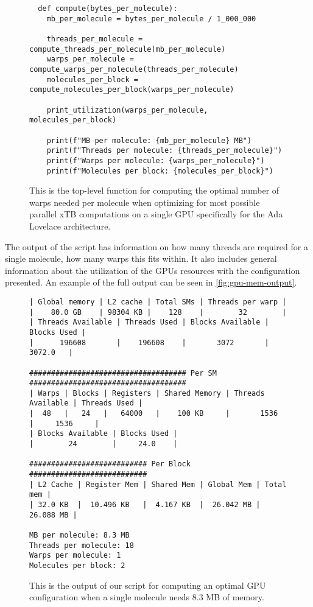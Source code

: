 \begin{figure}[h!]
\begin{verbatim}
  def compute(bytes_per_molecule):
    mb_per_molecule = bytes_per_molecule / 1_000_000

    threads_per_molecule = compute_threads_per_molecule(mb_per_molecule)
    warps_per_molecule = compute_warps_per_molecule(threads_per_molecule)
    molecules_per_block = compute_molecules_per_block(warps_per_molecule)

    print_utilization(warps_per_molecule, molecules_per_block)

    print(f"MB per molecule: {mb_per_molecule} MB")
    print(f"Threads per molecule: {threads_per_molecule}")
    print(f"Warps per molecule: {warps_per_molecule}")
    print(f"Molecules per block: {molecules_per_block}")
\end{verbatim}
  \caption{This is the top-level function for computing the optimal number of warps needed per molecule when optimizing for most possible parallel xTB computations on a single GPU specifically for the Ada Lovelace architecture.}
\end{figure}

The output of the script has information on how many threads are required for a single molecule, how many warps this fits within. It also includes general information about the utilization of the GPUs resources with the configuration presented. An example of the full output can be seen in \autoref{fig:gpu-mem-output}.


\begin{figure}[h!]
\begin{verbatim}
| Global memory | L2 cache | Total SMs | Threads per warp |
|    80.0 GB    | 98304 KB |    128    |        32        |
| Threads Available | Threads Used | Blocks Available | Blocks Used |
|      196608       |    196608    |       3072       |    3072.0   |

#################################### Per SM ####################################
| Warps | Blocks | Registers | Shared Memory | Threads Available | Threads Used |
|  48   |   24   |   64000   |    100 KB     |       1536        |     1536     |
| Blocks Available | Blocks Used |
|        24        |     24.0    |

########################### Per Block ###########################
| L2 Cache | Register Mem | Shared Mem | Global Mem | Total mem |
| 32.0 KB  |  10.496 KB   |  4.167 KB  |  26.042 MB | 26.088 MB |

MB per molecule: 8.3 MB
Threads per molecule: 18
Warps per molecule: 1
Molecules per block: 2
\end{verbatim}
\caption{This is the output of our script for computing an optimal GPU configuration when a single molecule needs $8.3$ MB of memory.}
\label{fig:gpu-mem-output}
\end{figure}


